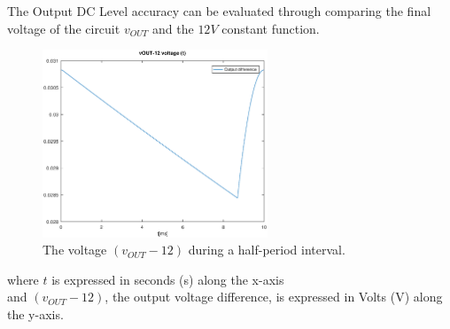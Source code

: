 \begin{center}
   \begin{tabular}{|c||c|}
      \hline
        
   \end{tabular}
 \end{center}

The Output DC Level accuracy can be evaluated through comparing the final voltage of the circuit $v_{OUT}$ and the $12 V$ constant function. 

\begin{figure}[H] \centering
\includegraphics[width=0.6\textwidth]{outputdiff.eps}
\caption{The voltage $(v_{OUT}-12)$ during a half-period interval.}
\label{fig:outputdiff}
\end{figure}

where $t$ is expressed in seconds (s) along the x-axis\\
and $(v_{OUT}-12)$, the output voltage difference, is expressed in Volts (V) along the y-axis.

